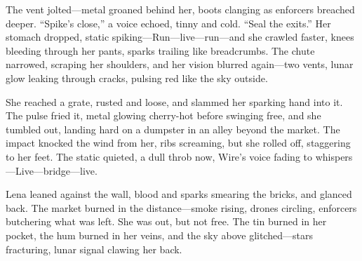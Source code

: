 \documentclass[12pt]{book}
\begin{document}
The vent jolted—metal groaned behind her, boots clanging as enforcers breached deeper. “Spike’s close,” a voice echoed, tinny and cold. “Seal the exits.” Her stomach dropped, static spiking—Run—live—run—and she crawled faster, knees bleeding through her pants, sparks trailing like breadcrumbs. The chute narrowed, scraping her shoulders, and her vision blurred again—two vents, lunar glow leaking through cracks, pulsing red like the sky outside.

She reached a grate, rusted and loose, and slammed her sparking hand into it. The pulse fried it, metal glowing cherry-hot before swinging free, and she tumbled out, landing hard on a dumpster in an alley beyond the market. The impact knocked the wind from her, ribs screaming, but she rolled off, staggering to her feet. The static quieted, a dull throb now, Wire’s voice fading to whispers—Live—bridge—live.

Lena leaned against the wall, blood and sparks smearing the bricks, and glanced back. The market burned in the distance—smoke rising, drones circling, enforcers butchering what was left. She was out, but not free. The tin burned in her pocket, the hum burned in her veins, and the sky above glitched—stars fracturing, lunar signal clawing her back.
\end{document}
